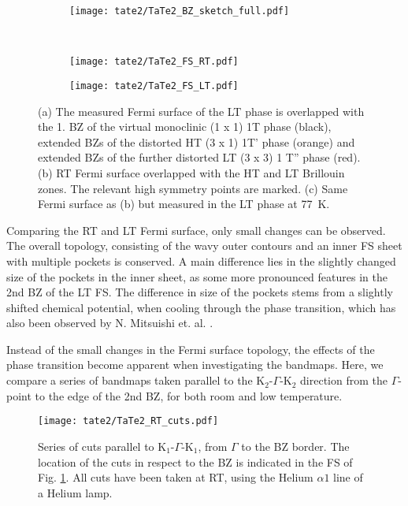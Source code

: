 \begin{figure}[h!]
	\centering
	\begin{subfigure}[b]{0.5\textwidth}
		\texttt{[image: tate2/TaTe2\_BZ\_sketch\_full.pdf]}
		\caption{}
	\end{subfigure}
	\hfill
	\\
	\begin{subfigure}[b]{0.49\textwidth}
		\texttt{[image: tate2/TaTe2\_FS\_RT.pdf]}
		\caption{}
	\end{subfigure}
	\hfill
	\begin{subfigure}[b]{0.49\textwidth}
		\texttt{[image: tate2/TaTe2\_FS\_LT.pdf]}
		\caption{}
	\end{subfigure}
	\caption{(a) The measured Fermi surface of the LT phase is overlapped with the 1. BZ of the virtual monoclinic (1 x 1) 1T phase (black), extended BZs of the distorted HT (3 x 1) 1T' phase (orange) and extended BZs of the further distorted LT (3 x 3) 1 T'' phase (red). (b) RT Fermi surface overlapped with the HT and LT Brillouin zones. The relevant high symmetry points are marked. (c) Same Fermi surface as (b) but measured in the LT phase at \qty{77}{\kelvin}.}
	\label{fig:TaTe_FS}
\end{figure}

Comparing the RT and LT Fermi surface, only small changes can be observed.
The overall topology, consisting of the wavy outer contours and an inner FS sheet with multiple pockets is conserved.
A main difference lies in the slightly changed size of the pockets in the inner sheet, as some more pronounced features in the 2nd BZ of the LT FS.
The difference in size of the pockets stems from a slightly shifted chemical potential, when cooling through the phase transition, which has also been observed by N. Mitsuishi et. al. \cite{mitsuishi_unveiling_2024}.

Instead of the small changes in the Fermi surface topology, the effects of the phase transition become apparent when investigating the bandmaps.
Here, we compare a series of bandmaps taken parallel to the K$_2$-$\Gamma$-K$_2$ direction from the $\Gamma$-point to the edge of the 2nd BZ, for both room and low temperature.

\begin{figure}[t!]
	\centering
	\texttt{[image: tate2/TaTe2\_RT\_cuts.pdf]}
	\caption{Series of cuts parallel to K$_1$-$\Gamma$-K$_1$, from $\Gamma$ to the BZ border. The location of the cuts in respect to the BZ is indicated in the FS of Fig. \ref{fig:TaTe_FS}. All cuts have been taken at RT, using the Helium $\alpha1$ line of a Helium lamp.}
	\label{fig:TaTe_RT_cuts}
\end{figure}

